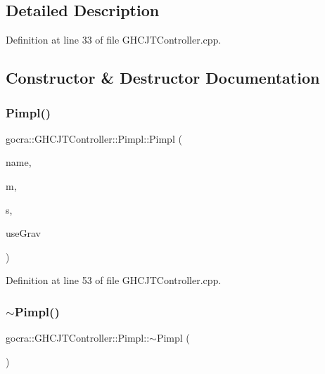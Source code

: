 \subsection{Detailed Description}


Definition at line 33 of file G\+H\+C\+J\+T\+Controller.\+cpp.



\subsection{Constructor \& Destructor Documentation}
\hypertarget{structgocra_1_1GHCJTController_1_1Pimpl_ad9ff86db7b59559d42a4d87eee73c761}{}\label{structgocra_1_1GHCJTController_1_1Pimpl_ad9ff86db7b59559d42a4d87eee73c761} 
\subsubsection{\texorpdfstring{Pimpl()}{Pimpl()}}
{\footnotesize\ttfamily gocra\+::\+G\+H\+C\+J\+T\+Controller\+::\+Pimpl\+::\+Pimpl (\begin{DoxyParamCaption}\item[{const std\+::string \&}]{name,  }\item[{\hyperlink{classocra_1_1Model}{Model} \&}]{m,  }\item[{\hyperlink{classocra_1_1OneLevelSolver}{ocra\+::\+One\+Level\+Solver} \&}]{s,  }\item[{bool}]{use\+Grav }\end{DoxyParamCaption})\hspace{0.3cm}{\ttfamily [inline]}}



Definition at line 53 of file G\+H\+C\+J\+T\+Controller.\+cpp.

\hypertarget{structgocra_1_1GHCJTController_1_1Pimpl_a0df04a7ffd9f5bc6346fc786d1c30ef1}{}\label{structgocra_1_1GHCJTController_1_1Pimpl_a0df04a7ffd9f5bc6346fc786d1c30ef1} 
\subsubsection{\texorpdfstring{$\sim$\+Pimpl()}{~Pimpl()}}
{\footnotesize\ttfamily gocra\+::\+G\+H\+C\+J\+T\+Controller\+::\+Pimpl\+::$\sim$\+Pimpl (\begin{DoxyParamCaption}{ }\end{DoxyParamCaption})\hspace{0.3cm}{\ttfamily [inline]}}



